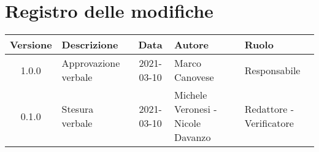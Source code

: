 \section*{Registro delle modifiche}

\begin{center}
	\begin{longtable}{|c|p{4cm}|c|p{3cm}|p{3cm}|}
		\hline
		\rowcolor{lighter-grayer}
		\textbf{Versione} & \textbf{Descrizione} & \textbf{Data} & \textbf{Autore} & \textbf{Ruolo} \\
		\hline
		\endfirsthead

		\hline
		1.0.0 & Approvazione verbale & 2021-03-10 & Marco Canovese & Responsabile \\
		0.1.0 & Stesura verbale & 2021-03-10 & Michele Veronesi - Nicole Davanzo & Redattore - Verificatore \\
		\hline
	\end{longtable}
\end{center}